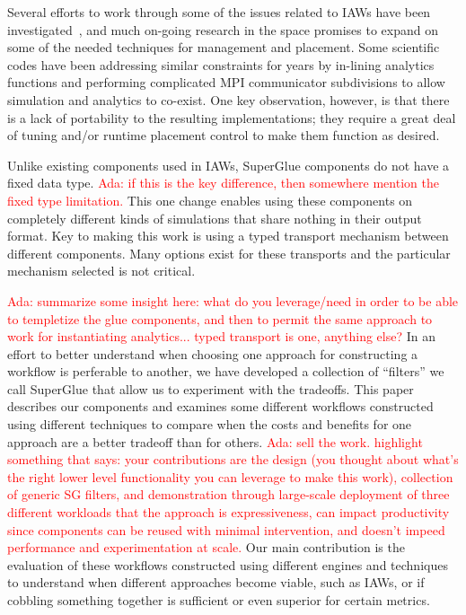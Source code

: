 \documentclass[conference]{IEEEtran}
\newcommand{\ada}[1]{\textcolor{red}{Ada: #1}}
\begin{document}
Several efforts to work through some of the issues related to IAWs have been
investigated~\cite{karimabadi:2013:catalyst,whitlock:2011:libsim,Glean,dayal:2014:flexpath,dreher:2016:bredala,zheng:2010:predata},
and much on-going research in the space promises to expand on some of the
needed techniques for management and placement.  Some
scientific codes have been addressing similar constraints for years by
in-lining analytics functions and performing complicated MPI communicator
subdivisions to allow simulation and analytics to co-exist.  One key
observation, however, is that there is a lack of portability to the resulting
implementations; they require a great deal of tuning and/or runtime placement
control to make them function as desired.

Unlike existing components used in IAWs, SuperGlue
components do not have a fixed data type. \ada{if this is the key
  difference, then somewhere mention the fixed type limitation. }
 This one change enables using these
components on completely different kinds of simulations that share nothing in
their output format. Key to making this work is using a typed transport
mechanism between different components. Many options exist for these transports
and the particular mechanism selected is not critical. 

\ada{summarize some insight here: what do you leverage/need in order
  to be able to templetize the glue components, and then to permit the
same approach to work for instantiating analytics... typed transport
is one, anything else?}
In an effort to better understand when choosing one approach for constructing a
workflow is perferable to another, we have developed a collection of ``filters''
we call SuperGlue that allow us to experiment with the tradeoffs. This paper
describes our components and examines some different workflows constructed using
different techniques to compare when the costs and benefits for one approach are
a better tradeoff than for others. 
\ada{sell the work. highlight something that says: your contributions are the design (you thought
  about what's the right lower level functionality you can leverage to
  make this work), collection of generic SG filters, and demonstration
through large-scale deployment of three different workloads that the
approach is 
expressiveness, can impact productivity since components can be reused
with minimal intervention, and doesn't impeed performance and
experimentation at scale. }
Our main contribution is the evaluation of
these workflows constructed using different engines and techniques to understand
when different approaches become viable, such as IAWs, or if cobbling something
together is sufficient or even superior for certain metrics.
\end{document}
